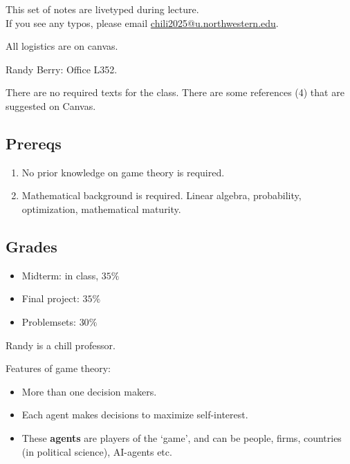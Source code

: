 This set of notes are livetyped during lecture.\\ If you see any typos, please email \href{mailto:chili2025@u.northwestern.edu}{chili2025@u.northwestern.edu}.
\newsection

All logistics are on canvas.

Randy Berry: Office L352.

There are no required texts for the class. There are some references (4) that are suggested on Canvas. 
\subsection*{Prereqs}
\begin{enumerate}
    \item No prior knowledge on game theory is required.
    \item Mathematical background is required. Linear algebra, probability, optimization, mathematical maturity.
\end{enumerate}
\subsection*{Grades}
\begin{itemize}
    \item Midterm: in class, $35\%$
    \item Final project: $35\%$
    \item Problemsets: $30\%$
\end{itemize}
\begin{atheorem}{}{}
    Randy is a chill professor.
\end{atheorem}
\newsection
{}
Features of game theory:\begin{itemize}
    \item More than one decision makers.
    \item Each agent makes decisions to maximize self-interest.
    \item These \textbf{agents} are players of the `game', and can be people, firms, countries (in political science), AI-agents etc.
\end{itemize}


